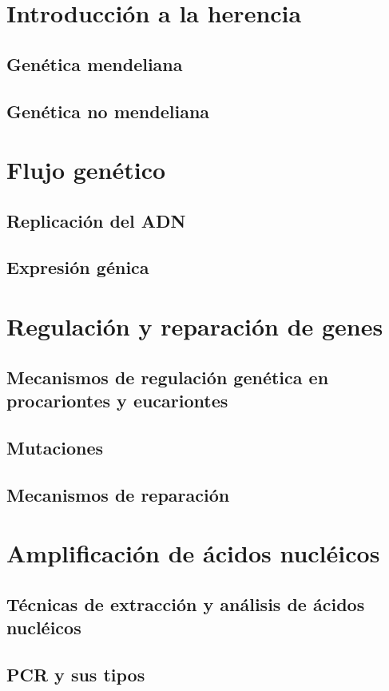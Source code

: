 \documentclass{../Resume}
\begin{document}
\Portada
\Indice
\fancystyle
\onehalfspacing


\part{Introducción a la herencia}

    \chapter{Genética mendeliana}
    \chapter{Genética no mendeliana}

\part{Flujo genético}

    \chapter{Replicación del ADN}
        

    \chapter{Expresión génica}
        

\part{Regulación y reparación de genes}

    \chapter{Mecanismos de regulación genética en procariontes y eucariontes}
        
    
    \chapter{Mutaciones}
    \chapter{Mecanismos de reparación}

\part{Amplificación de ácidos nucléicos}

    \chapter{Técnicas de extracción y análisis de ácidos nucléicos}
    \chapter{PCR y sus tipos}
        


\newpage


\end{document}
